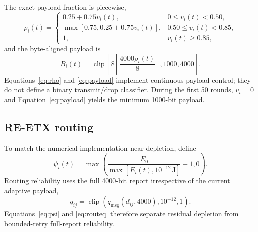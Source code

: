 \documentclass[pdflatex,sn-mathphys-num]{sn-jnl}
\begin{document}
The exact payload fraction is piecewise,
\begin{equation}
\rho_i(t)=
\begin{cases}
0.25+0.75v_i(t), & 0\le v_i(t)<0.50,\\
\max[0.75,0.25+0.75v_i(t)], & 0.50\le v_i(t)<0.85,\\
1, & v_i(t)\ge0.85,
\end{cases}
\label{eq:rho}
\end{equation}
and the byte-aligned payload is
\begin{equation}
B_i(t)=\operatorname{clip}\!\left[8\left\lceil\frac{4000\rho_i(t)}{8}\right\rceil,1000,4000\right].
\label{eq:payload}
\end{equation}
Equations~\eqref{eq:rho} and \eqref{eq:payload} implement continuous payload control; they do not define a binary transmit/drop classifier. During the first 50 rounds, $v_i=0$ and Equation~\eqref{eq:payload} yields the minimum 1000-bit payload.

\subsection{RE-ETX routing}

To match the numerical implementation near depletion, define
\begin{equation}
\psi_i(t)=\max\!\left(\frac{E_0}{\max[E_i(t),10^{-12}\,\mathrm{J}]}-1,0\right).
\label{eq:psi}
\end{equation}
Routing reliability uses the full 4000-bit report irrespective of the current adaptive payload,
\begin{equation}
q_{ij}=\operatorname{clip}\!\left(q_{\mathrm{msg}}(d_{ij},4000),10^{-12},1\right).
\label{eq:routeq}
\end{equation}
Equations~\eqref{eq:psi} and \eqref{eq:routeq} therefore separate residual depletion from bounded-retry full-report reliability.
\end{document}
